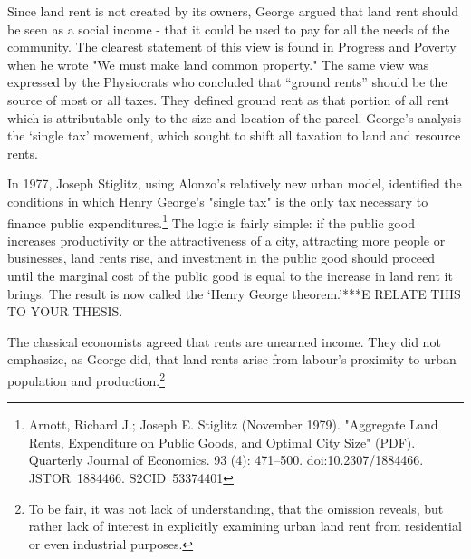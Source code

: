Since land rent is not created by its owners, George argued that land rent should be seen as a social income - that it could be used to pay for all the needs of the community. The clearest statement of this view is found in Progress and Poverty when he wrote "We must make land common property." The same view was expressed by the Physiocrats who concluded  that ``ground rents'' should be the source of most or all taxes. They defined ground rent as that portion of all rent which is attributable only to the size and location of the parcel. George's analysis the `single tax' movement, which sought to shift all taxation to land  and resource rents.   
  
In 1977, Joseph Stiglitz, using Alonzo's relatively new urban model, identified the conditions in which Henry George's "single tax" is  the only tax necessary to finance public expenditures.\footnote{Arnott, Richard J.; Joseph E. Stiglitz (November 1979). "Aggregate Land Rents, Expenditure on Public Goods, and Optimal City Size" (PDF). Quarterly Journal of Economics. 93 (4): 471–500. doi:10.2307/1884466. JSTOR 1884466. S2CID 53374401 }   The logic is fairly simple: if the public good increases productivity or the attractiveness of a city, attracting more people or businesses, land rents rise, and investment in the public good should proceed until the marginal cost of the public good is equal to the increase in land rent it brings. The result is now called the `Henry George theorem.'***E RELATE THIS TO YOUR THESIS. %
  
The classical economists agreed that rents are unearned income. They did not emphasize, as George did, that land rents arise from labour's proximity to urban population and production.\footnote{To be fair, it was not lack of understanding, that the omission reveals, but rather lack of interest in explicitly examining urban land rent from residential or even industrial purposes.}%

